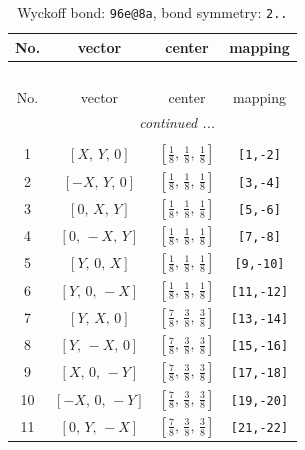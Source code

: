 \documentclass[fleqn,8pt]{jsarticle}
\begin{document}
\begin{longtable}{cccc}
\caption{Wyckoff bond: {\tt 96e@8a}, bond symmetry: {\tt 2..}}
 \\
 \hline \hline
No. & vector & center & mapping \\ \hline \endfirsthead

\multicolumn{3}{l}{\tablename\ \thetable{}} \\
 \hline \hline
No. & vector & center & mapping \\ \hline \endhead

 \hline \hline
\multicolumn{3}{r}{\footnotesize\it continued ...} \\ \endfoot

 \hline \hline
\multicolumn{3}{r}{} \\ \endlastfoot

1 & $\left[ X,\, Y,\, 0 \right]$ & $\left[ \frac{1}{8},\, \frac{1}{8},\, \frac{1}{8} \right]$ & {\tt [1,-2]} \\ \hline
2 & $\left[ - X,\, Y,\, 0 \right]$ & $\left[ \frac{1}{8},\, \frac{1}{8},\, \frac{1}{8} \right]$ & {\tt [3,-4]} \\ \hline
3 & $\left[ 0,\, X,\, Y \right]$ & $\left[ \frac{1}{8},\, \frac{1}{8},\, \frac{1}{8} \right]$ & {\tt [5,-6]} \\ \hline
4 & $\left[ 0,\, - X,\, Y \right]$ & $\left[ \frac{1}{8},\, \frac{1}{8},\, \frac{1}{8} \right]$ & {\tt [7,-8]} \\ \hline
5 & $\left[ Y,\, 0,\, X \right]$ & $\left[ \frac{1}{8},\, \frac{1}{8},\, \frac{1}{8} \right]$ & {\tt [9,-10]} \\ \hline
6 & $\left[ Y,\, 0,\, - X \right]$ & $\left[ \frac{1}{8},\, \frac{1}{8},\, \frac{1}{8} \right]$ & {\tt [11,-12]} \\ \hline
7 & $\left[ Y,\, X,\, 0 \right]$ & $\left[ \frac{7}{8},\, \frac{3}{8},\, \frac{3}{8} \right]$ & {\tt [13,-14]} \\ \hline
8 & $\left[ Y,\, - X,\, 0 \right]$ & $\left[ \frac{7}{8},\, \frac{3}{8},\, \frac{3}{8} \right]$ & {\tt [15,-16]} \\ \hline
9 & $\left[ X,\, 0,\, - Y \right]$ & $\left[ \frac{7}{8},\, \frac{3}{8},\, \frac{3}{8} \right]$ & {\tt [17,-18]} \\ \hline
10 & $\left[ - X,\, 0,\, - Y \right]$ & $\left[ \frac{7}{8},\, \frac{3}{8},\, \frac{3}{8} \right]$ & {\tt [19,-20]} \\ \hline
11 & $\left[ 0,\, Y,\, - X \right]$ & $\left[ \frac{7}{8},\, \frac{3}{8},\, \frac{3}{8} \right]$ & {\tt [21,-22]} \\ \hline

\end{longtable}
\end{document}
